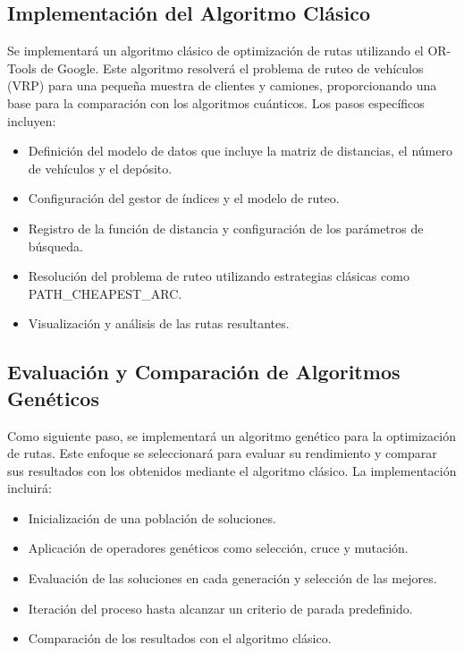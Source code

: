 \documentclass[11pt,a4paper,spanish]{book}
\begin{document}
\begin{itemize}
\section{Implementación del Algoritmo Clásico}

Se implementará un algoritmo clásico de optimización de rutas utilizando el OR-Tools de Google. Este algoritmo resolverá el problema de ruteo de vehículos (VRP) para una pequeña muestra de clientes y camiones, proporcionando una base para la comparación con los algoritmos cuánticos. Los pasos específicos incluyen:

\begin{itemize}
	\item Definición del modelo de datos que incluye la matriz de distancias, el número de vehículos y el depósito.
	\item Configuración del gestor de índices y el modelo de ruteo.
	\item Registro de la función de distancia y configuración de los parámetros de búsqueda.
	\item Resolución del problema de ruteo utilizando estrategias clásicas como PATH\_CHEAPEST\_ARC.
	\item Visualización y análisis de las rutas resultantes.
\end{itemize}

\subsection{Evaluación y Comparación de Algoritmos Genéticos}

Como siguiente paso, se implementará un algoritmo genético para la optimización de rutas. Este enfoque se seleccionará para evaluar su rendimiento y comparar sus resultados con los obtenidos mediante el algoritmo clásico. La implementación incluirá:

\begin{itemize}
	\item Inicialización de una población de soluciones.
	\item Aplicación de operadores genéticos como selección, cruce y mutación.
	\item Evaluación de las soluciones en cada generación y selección de las mejores.
	\item Iteración del proceso hasta alcanzar un criterio de parada predefinido.
	\item Comparación de los resultados con el algoritmo clásico.
\end{itemize}


\end{itemize}
\end{document}
